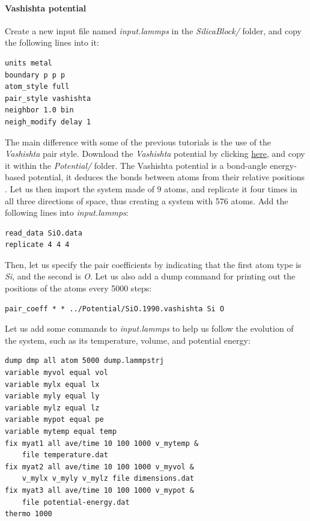 \documentclass[9pt,tutorial]{livecoms}
\begin{document}
\paragraph{Vashishta potential}
Create a new input file named \textit{input.lammps} in the \textit{SilicaBlock/} folder, and copy
the following lines into it:
{\normalsize \begin{verbatim}
units metal
boundary p p p
atom_style full
pair_style vashishta
neighbor 1.0 bin
neigh_modify delay 1
\end{verbatim}}
The main difference with some of the previous tutorials is the use of the \textit{Vashishta} pair style. Download the \textit{Vashishta} potential by clicking \href{https://raw.githubusercontent.com/lammpstutorials/lammpstutorials-article/main/files/tutorial6/SiO.1990.vashishta}{here}, and copy it within the \textit{Potential/} folder. The Vashishta potential is a bond-angle energy-based potential, it deduces the bonds between atoms from their relative positions \cite{vashishta1990interaction}. Let us then import the system made of 9 atoms, and replicate it four times in all three
directions of space, thus creating a system with 576 atoms. Add the following lines into \textit{input.lammps}:
{\normalsize \begin{verbatim}
read_data SiO.data
replicate 4 4 4
\end{verbatim}}
Then, let us specify the pair coefficients by indicating that the first atom type is \textit{Si}, and
the second is \textit{O}. Let us also add a dump command for printing out the positions of the atoms every 5000 steps:
{\normalsize \begin{verbatim}
pair_coeff * * ../Potential/SiO.1990.vashishta Si O
\end{verbatim}}
\noindent Let us add some commands to \textit{input.lammps} to help us follow the evolution of the system, such as its temperature, volume, and potential energy:
{\normalsize \begin{verbatim}
dump dmp all atom 5000 dump.lammpstrj
variable myvol equal vol
variable mylx equal lx
variable myly equal ly
variable mylz equal lz
variable mypot equal pe
variable mytemp equal temp
fix myat1 all ave/time 10 100 1000 v_mytemp &
    file temperature.dat
fix myat2 all ave/time 10 100 1000 v_myvol &
    v_mylx v_myly v_mylz file dimensions.dat
fix myat3 all ave/time 10 100 1000 v_mypot &
    file potential-energy.dat
thermo 1000
\end{verbatim}}
\end{document}
